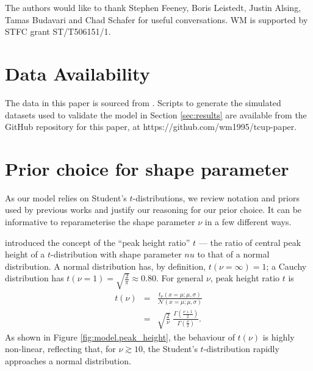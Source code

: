 \documentclass[fleqn,usenatbib]{mnras}
\newcommand{\studentt}[2]{t_\nu \left( #1, #2 \right)}
\begin{document}
The authors would like to thank Stephen Feeney, Boris Leistedt, Justin Alsing,
Tamas Budavari and Chad Schafer for useful conversations. WM is supported by
STFC grant ST/T506151/1.

\section*{Data Availability}


The data in this paper is sourced from \citet{Kelly:2007, Park:2017}. Scripts to
generate the simulated datasets used to validate the model in Section
\ref{sec:results} are available from the GitHub repository for this paper, at
https://github.com/wm1995/tcup-paper.







\appendix

\section{Prior choice for shape parameter}
\label{sec:t-prior}

As our model relies on Student's $t$-distributions, we review notation and
priors used by previous works and justify our reasoning for our prior choice. It
can be informative to reparameterise the shape parameter $\nu$ in a few
different ways.

\citet{Feeney:2018} introduced the concept of the ``peak height ratio'' $t$ ---
the ratio of central peak height of a $t$-distribution with shape parameter $nu$
to that of a normal distribution. A normal distribution has, by definition,
$t(\nu = \infty) = 1$; a Cauchy distribution has $t(\nu = 1) = \sqrt{\frac2\pi}
\approx 0.80$. For general $\nu$, peak height ratio $t$ is
\begin{eqnarray}
    t(\nu) &=& \frac{
        \studentt{x = \mu; \mu}{\sigma}
    }{
        \mathcal N \left(x = \mu; \mu, \sigma \right)
    } \\
    &=& \sqrt{\frac{2}{\nu}} \;
    \frac{
        \Gamma\left(\frac{\nu + 1}{2}\right)
    }{
        \Gamma\left(\frac{\nu}{2}\right)
    }.
\end{eqnarray}
As shown in Figure \ref{fig:model.peak_height}, the behaviour of $t(\nu)$ is
highly non-linear, reflecting that, for $\nu \gtrsim 10$, the Student's
$t$-distribution rapidly approaches a normal distribution.
\end{document}
